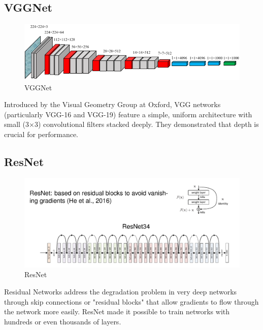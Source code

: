 
\subsection{VGGNet}
\begin{figure}[htbp]
   \centering
   \includegraphics{images/10/vgg.png}
   \caption{VGGNet}
   \label{fig:10/vgg}
\end{figure}
Introduced by the Visual Geometry Group at Oxford, VGG networks (particularly VGG-16 and VGG-19) feature a simple, uniform architecture with small (3×3) convolutional filters stacked deeply. They demonstrated that depth is crucial for performance.


\subsection{ResNet}

\begin{figure}[htbp]
   \centering
   \includegraphics{images/10/resnet.png}
   \caption{ResNet}
   \label{fig:10/resnet}
\end{figure}
Residual Networks address the degradation problem in very deep networks through skip connections or "residual blocks" that allow gradients to flow through the network more easily. ResNet made it possible to train networks with hundreds or even thousands of layers.

